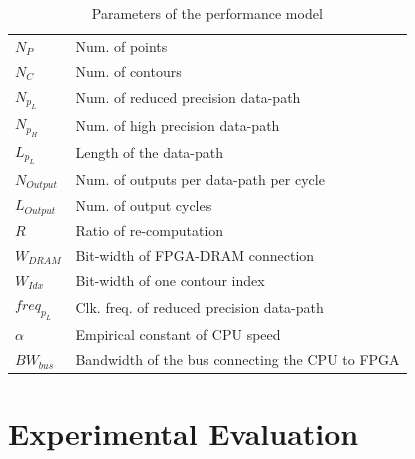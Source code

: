 \begin{table}[t!]
	\begin{spacing}{1.0}
	\caption{Parameters of the performance model}
	\label{tab:model}
	\centering
	\smallskip
	\begin{tabular}{|l|l|}
			\hline
			$N_P$			& Num. of points \\
			$N_C$			& Num. of contours \\
			$N_{p_L}$ 		& Num. of reduced precision data-path \\
			$N_{p_H}$ 		& Num. of high precision data-path \\
			$L_{p_L}$			& Length of the data-path \\
			$N_{Output}$ 	& Num. of outputs per data-path per cycle \\
			$L_{Output}$ 	& Num. of output cycles \\
			$R$ 			& Ratio of re-computation \\
			$W_{DRAM}$ 		& Bit-width of FPGA-DRAM connection \\
			$W_{Idx}$ 		& Bit-width of one contour index \\
			$freq_{p_L}$  	& Clk. freq. of reduced precision data-path \\
			$\alpha$ 		& Empirical constant of CPU speed \\
			$BW_{bus}$ 	& Bandwidth of the bus connecting the CPU to FPGA \\
			\hline
		\end{tabular}
	\end{spacing}
\end{table}

%


\section{Experimental Evaluation}
\label{sec:evaluation}

